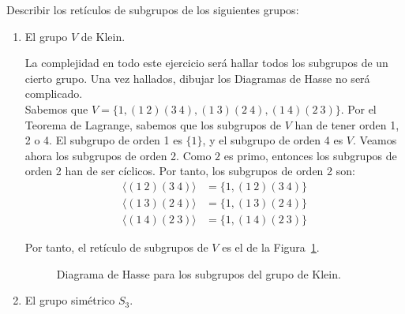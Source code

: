 \begin{ejercicio}\label{ej:3.11}
    Describir los retículos de subgrupos de los siguientes grupos:
    \begin{enumerate}
        \item El grupo $V$ de Klein.
        
        La complejidad en todo este ejercicio será hallar todos los subgrupos de un cierto grupo. Una vez hallados, dibujar los Diagramas de Hasse no será complicado.\\
        
        Sabemos que $V=\{1,(1\ 2)(3\ 4),(1\ 3)(2\ 4),(1\ 4)(2\ 3)\}$. Por el Teorema de Lagrange, sabemos que los subgrupos de $V$ han de tener orden 1, 2 o 4. El subgrupo de orden 1 es $\{1\}$, y el subgrupo de orden 4 es $V$. Veamos ahora los subgrupos de orden 2. Como $2$ es primo, entonces los subgrupos de orden 2 han de ser cíclicos. Por tanto, los subgrupos de orden 2 son:
        \begin{align*}
            \langle (1\ 2)(3\ 4)\rangle &= \{1,(1\ 2)(3\ 4)\}\\
            \langle (1\ 3)(2\ 4)\rangle &= \{1,(1\ 3)(2\ 4)\}\\
            \langle (1\ 4)(2\ 3)\rangle &= \{1,(1\ 4)(2\ 3)\}
        \end{align*}

        Por tanto, el retículo de subgrupos de $V$ es el de la Figura~\ref{fig:ej11_V}.
        \begin{figure}
            \centering
            \caption{Diagrama de Hasse para los subgrupos del grupo de Klein.}
            \label{fig:ej11_V}
        \end{figure}
        \item El grupo simétrico $S_3$.
        

\end{enumerate}
\end{ejercicio}
